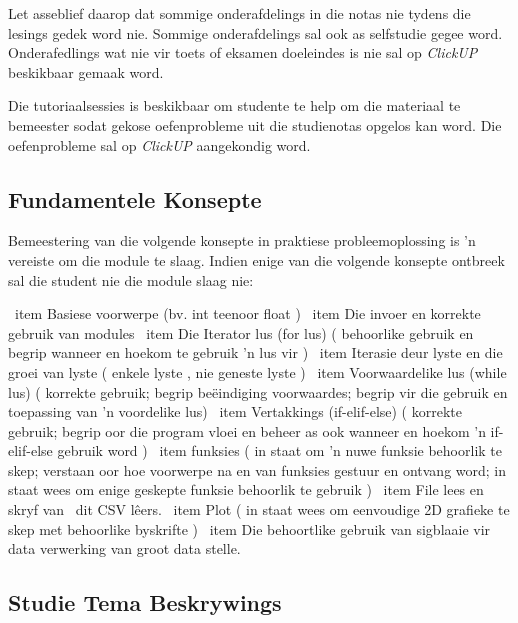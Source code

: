 	Let asseblief daarop dat sommige onderafdelings in die notas nie tydens die lesings
	gedek word nie. Sommige onderafdelings sal ook as selfstudie gegee word.
 	Onderafedlings wat nie vir toets of eksamen doeleindes is nie sal op \textit{ClickUP} beskikbaar 
	gemaak word.

	Die tutoriaalsessies is beskikbaar om studente te help om die materiaal te bemeester sodat 
	gekose oefenprobleme uit die studienotas opgelos kan word. Die oefenprobleme sal op 	   
     	\textit{ClickUP} aangekondig word.	
        
	\subsection{Fundamentele Konsepte}
	Bemeestering van die volgende konsepte in praktiese probleemoplossing is 'n vereiste om die
  	module te slaag. Indien enige
	van die volgende konsepte ontbreek sal die student nie die module slaag nie:

        \begin{itemize}
	\ item Basiese voorwerpe (bv. int teenoor float )
            \ item Die invoer en korrekte gebruik van modules
            \ item Die Iterator lus (for  lus) ( behoorlike gebruik en begrip wanneer en hoekom te gebruik
                'n lus vir )
            \ item Iterasie deur lyste en die groei van lyste ( enkele lyste , nie
                geneste lyste )
            \ item Voorwaardelike lus (while lus) ( korrekte gebruik; begrip be\"eindiging
                voorwaardes; begrip vir die gebruik en toepassing van 'n voordelike lus)
            \ item Vertakkings (if-elif-else) ( korrekte gebruik; begrip oor die program vloei en
                beheer as ook wanneer en hoekom 'n if-elif-else gebruik word )
            \ item funksies ( in staat om 'n nuwe funksie behoorlik te skep; verstaan oor
                hoe voorwerpe na en van funksies gestuur en ontvang word; in staat wees om enige
                geskepte funksie behoorlik te gebruik ) 
            \ item File lees en skryf van { \ dit CSV } lêers.
            \ item Plot ( in staat wees om eenvoudige 2D grafieke te skep met behoorlike
                byskrifte )
            \ item Die behoortlike gebruik van sigblaaie vir data verwerking van groot data stelle.
        \end{itemize}
    
    \subsection{Studie Tema Beskrywings}
